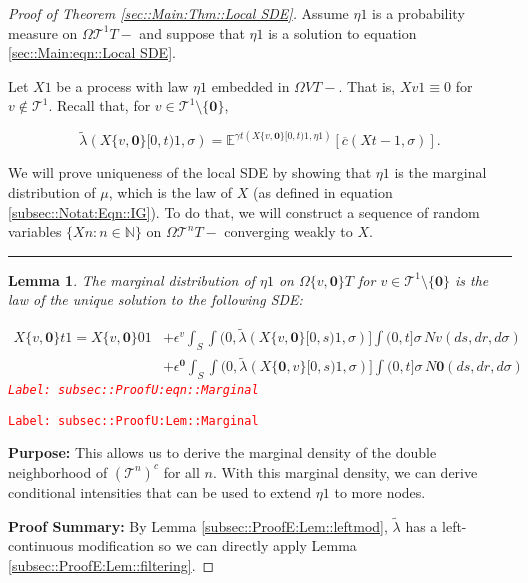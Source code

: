 \documentclass[12pt]{article}
\newcommand{\mb}{\mathbb}
\newcommand{\mc}{\mathcal}
\newcommand{\ov}{\overline}
\newcommand{\ep}{\epsilon}
\newcommand{\tr}{\textcolor{red}}
\newcommand{\labe}[1]{\tr{\texttt{Label: #1}}}
\newcommand{\purpose}{\textbf{Purpose: }}
\newcommand{\pfsum}{\textbf{Proof Summary: }}
\newcommand{\ind}{\hspace{24pt}}
\newcommand{\lin}{\rule{\linewidth}{0.4 pt}}
\newcommand{\exmu}[2]{\mb{E}^{#1}\left[#2\right]}	%
\renewcommand{\root}{\mathbf{0}}				%
\renewcommand{\v}{v}							%
\renewcommand{\S}{S}							%
\newcommand{\s}{\sigma}							%
\newcommand{\ev}{\ep}							%
\newcommand{\T}{T}								%
\renewcommand{\t}{t}							%
\renewcommand{\tt}{s}							%
\newcommand{\X}{X}								%
\newcommand{\vind}[1]{^{#1}}					%
\newcommand{\IGrg}{\ov{c}}						%
\newcommand{\tree}{\mc{T}}						%
\newcommand{\sln}[1]{^{#1}}						%
\newcommand{\poiss}{N}							%
\renewcommand{\r}{r}							%
\newcommand{\alt}[1]{\widetilde{#1}}			%
\newcommand{\m}{\mu}							%
\newcommand{\mmm}{\eta}							%
\newcommand{\cm}{\gamma}						%
\newcommand{\crate}{\alt{\lambda}}				%
\newtheorem{lem}[thms]{Lemma}
\begin{document}
\begin{proof}[Proof of Theorem \ref{sec::Main:Thm::Local SDE}]

Assume \(\mmm{}{}{1}\) is a probability measure on \(\Omega{\tree\sln{1}}{\T-}\) and suppose that \(\mmm{}{}{1}\) is a solution to equation \eqref{sec::Main:eqn::Local SDE}.

\ind Let \(\X{}{}{1}\) be a process with law \(\mmm{}{}{1}\) embedded in \(\Omega{V}{\T-}\). That is, \(\X{\v}{}{1} \equiv 0\) for \(\v \notin \tree\sln{1}\). Recall that, for \(\v \in \tree\sln{1}\setminus\{\root\}\),

\[\crate{}{}(\X{\{\v,\root\}}{[0,\t)}{1},\s) = \exmu{\cm{\t}(\X{\{\v,\root\}}{[0,\t)}{1},\mmm{}{}{1})}{\IGrg{}(\X{}{\t-}{1},\s)}.\]

\ind We will prove uniqueness of the local SDE by showing that \(\mmm{}{}{1}\) is the marginal distribution of \(\m{}{}{}\), which is the law of \(\X{}{}\) (as defined in equation \eqref{subsec::Notat:Eqn::IG}). To do that, we will construct a sequence of random variables \(\{\X{}{}{n}:n\in\mb{N}\}\) on \(\Omega{\tree\sln{n}}{\T-}\) converging weakly to \(\X{}{}\). 

\lin

\begin{lem}
The marginal distribution of \(\mmm{}{}{1}\) on \(\Omega{\{\v,\root\}}{\T}\) for \(\v \in \tree\sln{1}\setminus\{\root\}\) is the law of the unique solution to the following SDE:

\begin{align}
\X{\{\v,\root\}}{\t}{1} = \X{\{\v,\root\}}{0}{1} &+ \ev\vind{\v}\int_\S\int{(0,\crate{}{}(\X{\{\v,\root\}}{[0,\tt)}{1},\s)]}\int{(0,\t]}\s\,\poiss{\v}(d\tt,d\r,d\s)\nonumber\\
&+ \ev\vind{\root}\int_\S\int{(0,\crate{}{}(\X{\{\root,\v\}}{[0,\tt)}{1},\s)]}\int{(0,\t]}\s\,\poiss{\root}(d\tt,d\r,d\s)
\label{subsec::ProofU:eqn::Marginal}
\end{align}
\labe{subsec::ProofU:eqn::Marginal}
\label{subsec::ProofU:Lem::Marginal}
\end{lem}
\labe{subsec::ProofU:Lem::Marginal}

\purpose This allows us to derive the marginal density of the double neighborhood of \((\tree\sln{n})^c\) for all \(n\). With this marginal density, we can derive conditional intensities that can be used to extend \(\mmm{}{}{1}\) to more nodes.

\pfsum By Lemma \ref{subsec::ProofE:Lem::leftmod}, \(\crate{}{}\) has a left-continuous modification so we can directly apply Lemma \ref{subsec::ProofE:Lem::filtering}.


\end{proof}
\end{document}
